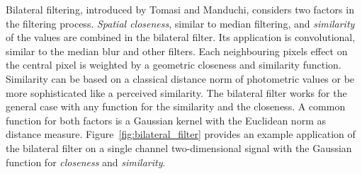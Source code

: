 Bilateral filtering, introduced by Tomasi and Manduchi\cite{tomasi_iccv98}, considers two factors in the filtering process.
\emph{Spatial closeness}, similar to median filtering, and \emph{similarity} of the values are combined in the bilateral filter.
Its application is convolutional, similar to the median blur and other filters.
Each neighbouring pixels effect on the central pixel is weighted by a geometric closeness and similarity function.
Similarity can be based on a classical distance norm of photometric values or be more sophisticated like a perceived similarity.
The bilateral filter works for the general case with any function for the similarity and the closeness.
A common function for both factors is a Gaussian kernel with the Euclidean norm as distance measure.
Figure~\ref{fig:bilateral_filter} provides an example application of the bilateral filter on a single channel two-dimensional signal with the Gaussian function for \emph{closeness} and \emph{similarity}.
